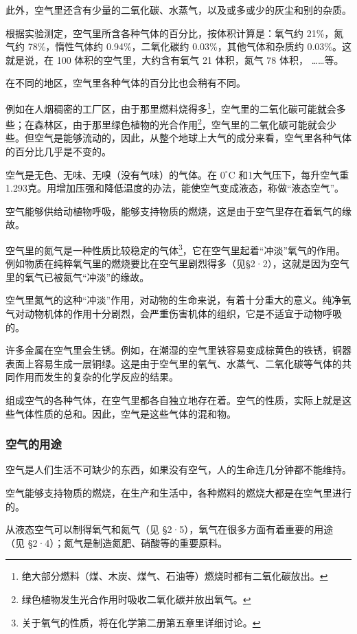 此外，空气里还含有少量的二氧化碳、水蒸气，以及或多或少的灰尘和别的杂质。

根据实验测定，空气里所含各种气体的百分比，按体积计算是：氧气约
21\%，氮气约 78\%，惰性气体约 0.94\%，二氧化碳约
0.03\%，其他气体和杂质约 0.03\%。这就是说，在 100
体积的空气里，大约含有氧气 21 体积，氮气 78 体积， \ldots\ldots 等。

在不同的地区，空气里各种气体的百分比也会稍有不同。

例如在人烟稠密的工厂区，由于那里燃料烧得多\footnote{绝大部分燃料（煤、木炭、煤气、石油等）燃烧时都有二氧化碳放出。}，空气里的二氧化碳可能就会多些；在森林区，由于那里绿色植物的光合作用\footnote{绿色植物发生光合作用时吸收二氧化碳并放出氧气。}，空气里的二氧化碳可能就会少些。但空气是能够流动的，因此，从整个地球上大气的成分来看，空气里各种气体的百分比几乎是不变的。

空气是无色、无味、无嗅（没有气味）的气体。在 \(0^{\circ}\mathrm{C}\)
和1大气压下，每升空气重1.293克。用增加压强和降低温度的办法，能使空气变成液态，称做``液态空气''。

空气能够供给动植物呼吸，能够支持物质的燃烧，这是由于空气里存在着氧气的缘故。

空气里的氮气是一种性质比较稳定的气体\footnote{关于氧气的性质，将在化学第二册第五章里详细讨论。}，它在空气里起着``冲淡''氧气的作用。例如物质在纯粹氧气里的燃烧要比在空气里剧烈得多（见§2·2），这就是因为空气里的氧气已被氮气``冲淡''的缘故。

空气里氮气的这种``冲淡''作用，对动物的生命来说，有着十分重大的意义。纯净氧气对动物机体的作用十分剧烈，会严重伤害机体的组织，它是不适宜于动物呼吸的。

许多金属在空气里会生锈。例如，在潮湿的空气里铁容易变成棕黄色的铁锈，铜器表面上容易生成一层铜绿。这是由于空气里的氧气、水蒸气、二氧化碳等气体的共同作用而发生的复杂的化学反应的结果。

组成空气的各种气体，在空气里都各自独立地存在着。空气的性质，实际上就是这些气体性质的总和。因此，空气是这些气体的混和物。

\subsubsection{空气的用途}

空气是人们生活不可缺少的东西，如果没有空气，人的生命连几分钟都不能维持。

空气能够支持物质的燃烧，在生产和生活中，各种燃料的燃烧大都是在空气里进行的。

从液态空气可以制得氧气和氮气（见
§2·5），氧气在很多方面有着重要的用途（见
§2·4）；氮气是制造氮肥、硝酸等的重要原料。

